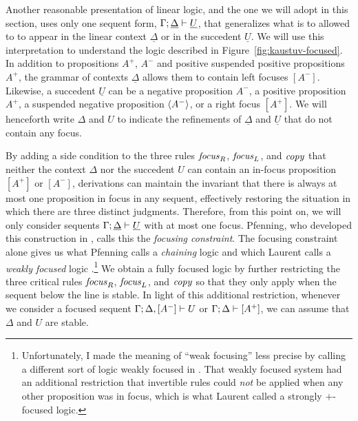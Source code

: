 Another reasonable presentation of linear logic, and the one we will
adopt in this section, uses only one sequent form,
${\Gamma};{\underline{\Delta}} \vdash {\underline{U}} \mathstrut$, that
generalizes what is to allowed to to appear in the linear context
$\underline{\Delta}$ or in the succedent $\underline{U}$. We will use
this interpretation to understand the logic described in
Figure~\ref{fig:kaustuv-focused}. In addition to propositions $A^+$,
$A^-$ and positive suspended positive propositions $A^+$, the grammar
of contexts $\underline{\Delta}$ allows them to contain left focuses
$[ A^- ]$.  Likewise, a succedent $\underline{U}$ can be a negative
proposition $A^-$, a positive proposition $A^+$, a suspended negative
proposition $\langle {A^-} \rangle$, or a right focus $[ A^+ ]$. We will
henceforth write $\Delta$ and $U$ to indicate the refinements of
$\underline{\Delta}$ and $\underline{U}$ that do not contain any
focus.



By adding a side condition to the three rules ${\it focus}_R$, ${\it
  focus}_L$, and ${\it copy}$ that neither the context $\Delta$ nor
the succedent $U$ can contain an in-focus proposition $[A^+]$ or
$[A^-]$, derivations can maintain the invariant that there is always
at most one proposition in focus in any sequent, effectively restoring
the situation in which there are three distinct
judgments. %
Therefore, from this point on, we
will only consider sequents
${\Gamma};{\underline{\Delta}} \vdash {\underline{U}} \mathstrut$ with at most one
focus. Pfenning, who developed this construction in
\cite{pfenning12chaining}, calls this the {\it focusing constraint}.
The focusing constraint alone gives us what Pfenning calls a {\it
  chaining} logic \cite{pfenning12chaining} and which Laurent calls a
{\it weakly focused} logic
\cite{laurent04proof}.\footnote{Unfortunately, I made the meaning of
  ``weak focusing'' less precise by calling a different sort of logic
  weakly focused in \cite{simmons11weak}.  That weakly focused system
  had an additional restriction that invertible rules could {\it not}
  be applied when any other proposition was in focus, which is what
  Laurent called a strongly $+$-focused logic.}  We obtain a fully
focused logic by further restricting the three critical rules ${\it
  focus}_R$, ${\it focus}_L$, and ${\it copy}$ so that they only apply
when the sequent below the line is stable. In light of this
additional restriction, whenever we consider a focused sequent
${\Gamma};{\Delta, [A^-]} \vdash {U} \mathstrut$ or
${\Gamma};{\Delta} \vdash {[A^+]} \mathstrut$, we can assume that $\Delta$ and $U$
are stable.

